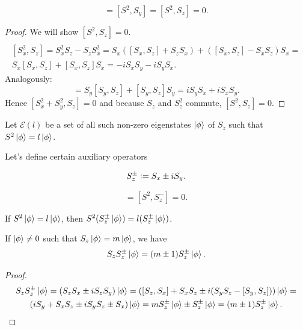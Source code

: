 \documentclass[main.tex]{subfiles}
\begin{document}
\begin{fact}
\begin{equation}
[S^2, S_x] = [S^2, S_y] = [S^2, S_z] = 0. 
\end{equation}
\begin{proof}
We will show $[S^2, S_z] = 0$.
\begin{multline*}
\\
[S_x^2, S_z] =
S_x^2 S_z - S_z S^2_x = S_x([S_x, S_z] + S_z S_x) + ([S_x, S_z] - S_x S_z)S_x = \\
S_x[S_x, S_z] + [S_x, S_z]S_x = -iS_x S_y - i S_y S_x.
\end{multline*}
Analogously:
\begin{equation}
[S_y^2, S_z] =
S_y[S_y, S_z] + [S_y, S_z]S_y = iS_y S_x + i S_x S_y.
\end{equation}
Hence $[S_x^2 + S_y^2, S_z] = 0$ and because $S_z$ and $S^2_z$ commute, $[S^2, S_z] = 0$.

\end{proof}
\end{fact}
\begin{definition}
Let $\mathcal{E}(l)$ be a set of all such non-zero eigenstates 
$\ket{\phi}$ 
of $S_z$ 
such that $S^2 \ket{\phi} = l \ket{\phi}$.    
\end{definition}

Let's define certain auxiliary operators

\begin{definition}
\begin{equation}
S_z^\pm \vcentcolon= S_x \pm iS_y.
\end{equation}
\end{definition}

\begin{corollary}
\begin{equation}
[S^2, S^{+}_z] = [S^2, S^{-}_z] = 0.
\end{equation}
\end{corollary}

\begin{corollary}
\label{spin-create-anihilate-in-space}
If $S^2\ket{\phi} = l \ket{\phi}$, then $S^2(S^{\pm}_z\ket{\phi}) = l(S^{\pm}_z\ket{\phi})$.  
\end{corollary}

\begin{fact}
If $\ket{\phi} \not= 0$ such that $S_z\ket{\phi} = m\ket{\phi}$, we have
\begin{equation}
S_z S_z^\pm \ket{\phi} = (m \pm 1) S_z^\pm \ket{\phi}.
\end{equation}
\end{fact}
\begin{proof}
\begin{multline*}
S_z S_z^\pm \ket{\phi} = (S_zS_x \pm iS_zS_y) \ket{\phi}
= ([S_z, S_x] + S_x S_z \pm i(S_y S_z - [S_y, S_z])) \ket{\phi} = \\
(iS_y + S_x S_z \pm iS_y S_z \pm S_x) \ket{\phi} = mS^{\pm}_z \ket{\phi} \pm S^{\pm}_z \ket{\phi} = (m \pm 1) S_z^\pm \ket{\phi}.\\
\end{multline*}
\end{proof}
\end{document}

